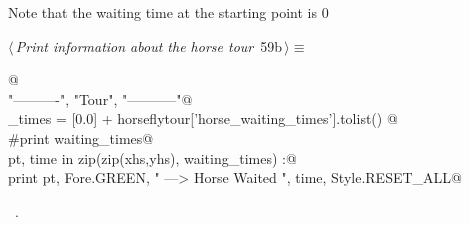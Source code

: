 \documentclass[11.5pt]{report}
\begin{document}
\vspace{-0.8cm} \newchunk  Note that the waiting time at the starting point is 0
\begin{flushleft} \small\label{scrap87}\raggedright\small
{} $\langle\,${\itshape Print information about the horse tour}\nobreak\ {\footnotesize {59b}}$\,\rangle\equiv$
\vspace{-1ex}
\begin{list}{}{} \item
\mbox{}\verb@   @\\
\mbox{}\verb@print "\n----------", "\nHorse Tour", "\n-----------"@\\
\mbox{}\verb@waiting_times = [0.0] + horseflytour['horse_waiting_times'].tolist() @\\
\mbox{}\verb@#print waiting_times@\\
\mbox{}\verb@for pt, time in zip(zip(xhs,yhs), waiting_times) :@\\
\mbox{}\verb@   print pt, Fore.GREEN, " ---> Horse Waited ", time, Style.RESET_ALL@\\
\mbox{}\verb@@{\NWsep}
\end{list}
\vspace{-1.5ex}
\footnotesize
\begin{list}{}{\setlength{\itemsep}{-\parsep}\setlength{\itemindent}{-\leftmargin}}
\item \NWtxtMacroRefIn\ .

\item{}
\end{list}
\vspace{4ex}
\end{flushleft}
\end{document}
